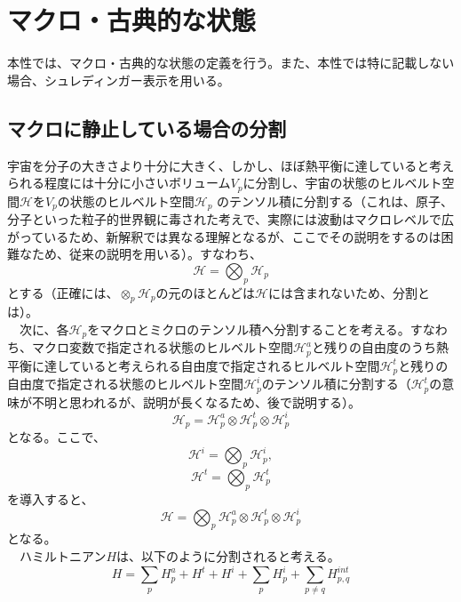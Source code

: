 \section{マクロ・古典的な状態}
本性では、マクロ・古典的な状態の定義を行う。また、本性では特に記載しない場合、シュレディンガー表示を用いる。
\subsection{マクロに静止している場合の分割}
宇宙を分子の大きさより十分に大きく、しかし、ほぼ熱平衡に達していると考えられる程度には十分に小さいボリューム$V_p$に分割し、宇宙の状態のヒルベルト空間$\mathcal{H}$を$V_p$の状態のヒルベルト空間$\mathcal{H}_p$ のテンソル積に分割する（これは、原子、分子といった粒子的世界観に毒された考えで、実際には波動はマクロレベルで広がっているため、新解釈では異なる理解となるが、ここでその説明をするのは困難なため、従来の説明を用いる）。すなわち、
\begin{equation}
    \mathcal{H} = \bigotimes_p \mathcal{H}_p
\end{equation}
とする（正確には、$\otimes_p \mathcal{H}_p$の元のほとんどは$\mathcal{H}$には含まれないため、分割とは）。\\
　次に、各$\mathcal{H}_p$をマクロとミクロのテンソル積へ分割することを考える。すなわち、マクロ変数で指定される状態のヒルベルト空間$\mathcal{H}_p^a$と残りの自由度のうち熱平衡に達していると考えられる自由度で指定されるヒルベルト空間$\mathcal{H}_p^t$と残りの自由度で指定される状態のヒルベルト空間$\mathcal{H}_p^i$のテンソル積に分割する（$\mathcal{H}_p^t$の意味が不明と思われるが、説明が長くなるため、後で説明する）。
\begin{equation}
    \mathcal{H}_p = \mathcal{H}_p^a \otimes \mathcal{H}_p^t \otimes \mathcal{H}_p^i
\end{equation}
となる。ここで、
\begin{equation}
    \mathcal{H}^i = \bigotimes_p \mathcal{H}_p^i,
\end{equation}
\begin{equation}
    \mathcal{H}^t = \bigotimes_p \mathcal{H}_p^t
\end{equation}
を導入すると、
\begin{equation}
    \mathcal{H} = \bigotimes_p \mathcal{H}_p^a \otimes  \mathcal{H}_p^t \otimes  \mathcal{H}_p^i
\end{equation}
となる。\\
　ハミルトニアン$H$は、以下のように分割されると考える。
\begin{equation}
H=\sum_pH_p^a + H^t + H^i + \sum_p H_p^i + \sum_{p \neq q} H^{int}_{p,q}
\end{equation}
